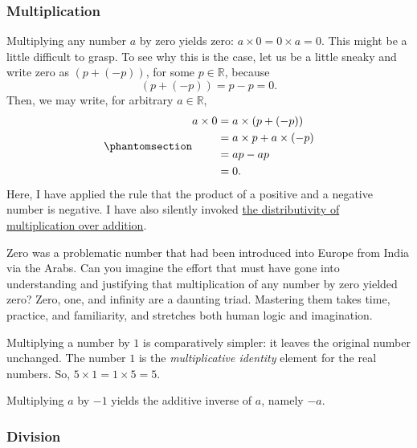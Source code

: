 \documentclass[
  a4paper,
]{article}
\begin{document}
\subsubsection{Multiplication}\label{multiplication}

Multiplying any number \(a\) by zero yields zero:
\(a \times 0 = 0 \times a = 0\). This might be a little difficult to
grasp. To see why this is the case, let us be a little sneaky and write
zero as \((p + (-p))\), for some \(p \in \mathbb{R}\), because \[
(p + (-p)) = p - p = 0.
\] Then, we may write, for arbitrary \(a \in \mathbb{R}\),
\begin{equation}\phantomsection\label{eq:multzero}{
\begin{aligned}
a \times 0 &= a \times (p + (-p))\\
&= a \times p + a\times (-p)\\
&= ap - ap\\
&= 0.
\end{aligned}
}\end{equation} Here, I have applied the rule that the product of a
positive and a negative number is negative. I have also silently invoked
\href{http://www.mathematicsdictionary.com/english/vmd/full/d/multiplicationoveraddition.htm}{the
distributivity of multiplication over addition}.

Zero was a problematic number that had been introduced into Europe from
India via the Arabs. Can you imagine the effort that must have gone into
understanding and justifying that multiplication of any number by zero
yielded zero? Zero, one, and infinity are a daunting triad. Mastering
them takes time, practice, and familiarity, and stretches both human
logic and imagination.

Multiplying a number by \(1\) is comparatively simpler: it leaves the
original number unchanged. The number \(1\) is the \emph{multiplicative
identity} element for the real numbers. So,
\(5 \times 1 = 1 \times 5 = 5\).

Multiplying \(a\) by \(-1\) yields the additive inverse of \(a\), namely
\(-a\).

\subsubsection{Division}\label{division}
\end{document}
